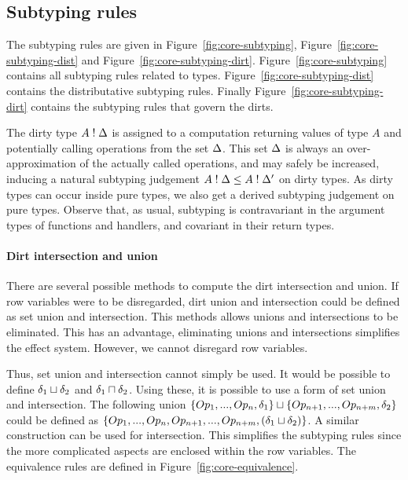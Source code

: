 \subsection{Subtyping rules}
The subtyping rules are given in Figure~\ref{fig:core-subtyping}, Figure~\ref{fig:core-subtyping-dist} and Figure~\ref{fig:core-subtyping-dirt}. Figure~\ref{fig:core-subtyping} contains all subtyping rules related to types. Figure~\ref{fig:core-subtyping-dist} contains the distributative subtyping rules. Finally Figure~\ref{fig:core-subtyping-dirt} contains the subtyping rules that govern the dirts.

The dirty type $A \mathrel{!} \Delta$ is assigned to a computation returning values of type $A$ and potentially calling operations from the set $\Delta$. This set $\Delta$ is always an over-approximation of the actually called operations, and may safely be increased, inducing a natural subtyping judgement $A \mathrel{!} \Delta \leq A \mathrel{!} \Delta'$ on dirty types. As dirty types can occur inside pure types, we also get a derived subtyping judgement on pure types. Observe that, as usual, subtyping is contravariant in the argument types of functions and handlers, and covariant in their return types.

\paragraph{Dirt intersection and union}
There are several possible methods to compute the dirt intersection and union. If row variables were to be disregarded, dirt union and intersection could be defined as set union and intersection. This methods allows unions and intersections to be eliminated. This has an advantage, eliminating unions and intersections simplifies the effect system. However, we cannot disregard row variables.

Thus, set union and intersection cannot simply be used. It would be possible to define $\delta_1 \sqcup \delta_2$ and $\delta_1 \sqcap \delta_2$. Using these, it is possible to use a form of set union and intersection. The following union $\{Op_1, ..., Op_n, \delta_1\} \sqcup \{Op_{n+1}, ..., Op_{n+m}, \delta_2\}$ could be defined as $\{Op_1, ..., Op_n, Op_{n+1}, ..., Op_{n+m}, (\delta_1 \sqcup \delta_2)\}$. A similar construction can be used for intersection. This simplifies the subtyping rules since the more complicated aspects are enclosed within the row variables. The equivalence rules are defined in Figure~\ref{fig:core-equivalence}.

